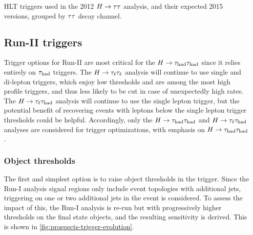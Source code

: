 \begin{table}[bp] 
  \centering
  \renewcommand{\arraystretch}{1.4}
  \caption{HLT triggers used in the 2012 $H\rightarrow\tau\tau$ analysis, and their expected 2015 versions, grouped by $\tau\tau$ decay channel.}
  
  \label{tab:prospects-triggersHLT}
\end{table}

\subsection{Run-II triggers}

Trigger options for Run-II are most critical for the $H\rightarrow\tau_\text{had}\tau_\text{had}$ since it relies entirely on $\tau_\text{had}$ triggers. The $H\rightarrow\tau_\ell\tau_\ell$ analysis will continue to use single and di-lepton triggers, which enjoy low thresholds and are among the most high profile triggers, and thus less likely to be cut in case of unexpectedly high rates. The $H\rightarrow\tau_\ell\tau_\text{had}$ analysis will continue to use the single lepton trigger, but the potential benefit of recovering events with leptons below the single lepton trigger thresholds could be helpful. Accordingly, only the $H\rightarrow\tau_\text{had}\tau_\text{had}$ and $H\rightarrow\tau_\ell\tau_\text{had}$ analyses are considered for trigger optimizations, with emphasis on $H\rightarrow\tau_\text{had}\tau_\text{had}$.

\subsubsection{Object thresholds}

The first and simplest option is to raise object thresholds in the trigger. Since the Run-I analysis signal regions only include event topologies with additional jets, triggering on one or two additional jets in the event is considered. To assess the impact of this, the Run-I analysis is re-run but with progressively higher thresholds on the final state objects, and the resulting sensitivity is derived. This is shown in \cref{fig:prospects-trigger-evolution}.

